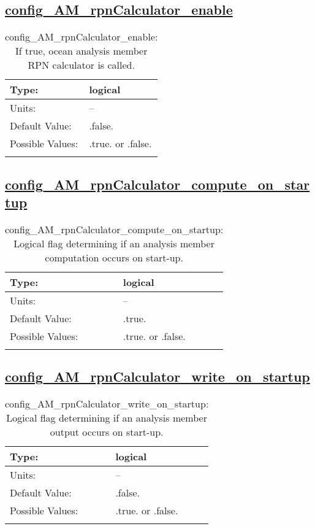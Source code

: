 \subsection[config\_AM\_rpnCalculator\_enable]{\hyperref[sec:nm_tab_AM_rpnCalculator]{config\_AM\_rpnCalculator\_enable}}
\label{subsec:nm_sec_config_AM_rpnCalculator_enable}
\begin{center}
\begin{longtable}{| p{2.0in} || p{4.0in} |}
    \hline
    Type: & logical \\
    \hline
    Units: & -- \\
    \hline
    Default Value: & .false. \\
    \hline
    Possible Values: & .true. or .false. \\
    \hline
    \caption{config\_AM\_rpnCalculator\_enable: If true, ocean analysis member RPN calculator is called.}
\end{longtable}
\end{center}
\subsection[config\_AM\_rpnCalculator\_compute\_on\_startup]{\hyperref[sec:nm_tab_AM_rpnCalculator]{config\_AM\_rpnCalculator\_compute\_on\_startup}}
\label{subsec:nm_sec_config_AM_rpnCalculator_compute_on_startup}
\begin{center}
\begin{longtable}{| p{2.0in} || p{4.0in} |}
    \hline
    Type: & logical \\
    \hline
    Units: & -- \\
    \hline
    Default Value: & .true. \\
    \hline
    Possible Values: & .true. or .false. \\
    \hline
    \caption{config\_AM\_rpnCalculator\_compute\_on\_startup: Logical flag determining if an analysis member computation occurs on start-up.}
\end{longtable}
\end{center}
\subsection[config\_AM\_rpnCalculator\_write\_on\_startup]{\hyperref[sec:nm_tab_AM_rpnCalculator]{config\_AM\_rpnCalculator\_write\_on\_startup}}
\label{subsec:nm_sec_config_AM_rpnCalculator_write_on_startup}
\begin{center}
\begin{longtable}{| p{2.0in} || p{4.0in} |}
    \hline
    Type: & logical \\
    \hline
    Units: & -- \\
    \hline
    Default Value: & .false. \\
    \hline
    Possible Values: & .true. or .false. \\
    \hline
    \caption{config\_AM\_rpnCalculator\_write\_on\_startup: Logical flag determining if an analysis member output occurs on start-up.}
\end{longtable}
\end{center}
